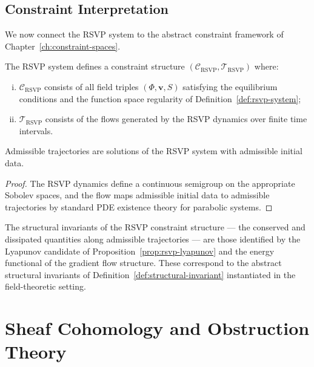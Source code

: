 \documentclass[11pt,openany]{book}
\begin{document}
\section{Constraint Interpretation}
\label{sec:constraint-interpretation}

We now connect the RSVP system to the abstract constraint
framework of Chapter~\ref{ch:constraint-spaces}.

\begin{proposition}
\label{prop:rsvp-as-constraint-app}
The RSVP system defines a constraint structure
$(\mathcal{C}_{\mathrm{RSVP}}, \mathcal{T}_{\mathrm{RSVP}})$
where:
\begin{enumerate}[(i)]
  \item $\mathcal{C}_{\mathrm{RSVP}}$ consists of all
    field triples $(\Phi, \boldsymbol{v}, S)$ satisfying
    the equilibrium conditions and the function space
    regularity of Definition~\ref{def:rsvp-system};
  \item $\mathcal{T}_{\mathrm{RSVP}}$ consists of the
    flows generated by the RSVP dynamics over finite time
    intervals.
\end{enumerate}
Admissible trajectories are solutions of the RSVP system
with admissible initial data.
\end{proposition}

\begin{proof}
The RSVP dynamics define a continuous semigroup on the
appropriate Sobolev spaces, and the flow maps admissible
initial data to admissible trajectories by standard PDE
existence theory for parabolic systems.
\end{proof}

The structural invariants of the RSVP constraint structure
— the conserved and dissipated quantities along admissible
trajectories — are those identified by the Lyapunov
candidate of Proposition~\ref{prop:rsvp-lyapunov} and the
energy functional of the gradient flow structure.  These
correspond to the abstract structural invariants of
Definition~\ref{def:structural-invariant} instantiated in
the field-theoretic setting.


\chapter[Sheaf Cohomology]{Sheaf Cohomology and Obstruction Theory}
\label{app:sheaves}
\end{document}
